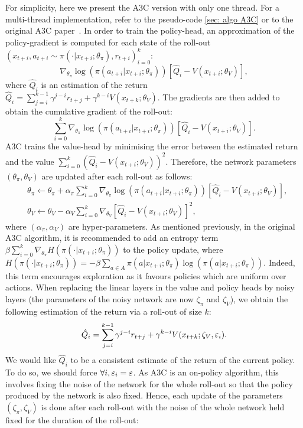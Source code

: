 \documentclass{article}
\begin{document}
For simplicity, here we present the A3C version with only one thread. For a  multi-thread implementation, refer to the pseudo-code \ref{sec: algo A3C} or to the original A3C paper~\citep{mnih2016asynchronous}. In order to train the policy-head, an approximation of the policy-gradient is computed for each state of the roll-out $(x_{t+i},a_{t+i}\sim\pi(\cdot|x_{t+i};\theta_\pi),r_{t+i})_{i=0}^{k}$:
 \begin{equation}
 \nabla_{\theta_\pi}\log(\pi(a_{t+i}|x_{t+i};\theta_\pi))[\hat{Q}_i-V(x_{t+i};\theta_V)],  
 \end{equation}
 where $\hat{Q}_i$ is an estimation of the return $\hat{Q}_i=\sum_{j=i}^{k-1}\gamma^{j-i}r_{t+j}+\gamma^{k-i}V(x_{t+k};\theta_V).$ The gradients are then added to obtain the cumulative gradient of the roll-out:
 \begin{equation}
 \sum_{i=0}^k\nabla_{\theta_\pi}\log(\pi(a_{t+i}|x_{t+i};\theta_\pi))[\hat{Q}_i-V(x_{t+i};\theta_V)].
 \end{equation}
 A3C trains the value-head by minimising the error between the estimated return and the value $\sum_{i=0}^k(\hat{Q}_i-V(x_{t+i};\theta_V))^2$. Therefore, the network parameters $(\theta_\pi,\theta_V)$ are updated after each roll-out as follows:
 \begin{align}
 &\theta_\pi \leftarrow \theta_\pi + \alpha_\pi\sum_{i=0}^k\nabla_{\theta_\pi}\log(\pi(a_{t+i}|x_{t+i};\theta_\pi))[\hat{Q}_i-V(x_{t+i};\theta_V)],
 \\
 &\theta_V \leftarrow \theta_V -\alpha_V\sum_{i=0}^k\nabla_{\theta_V}[\hat{Q}_i-V(x_{t+i};\theta_V)]^2,
 \end{align}
 where $(\alpha_\pi,\alpha_V)$ are hyper-parameters. As mentioned previously, in the original A3C algorithm, it is recommended to add an entropy term $\beta\sum_{i=0}^k\nabla_{\theta_\pi} H(\pi(\cdot|x_{t+i};\theta_\pi))$ to the policy update, where $H(\pi(\cdot|x_{t+i};\theta_\pi))=-\beta\sum_{a\in A}\pi(a|x_{t+i};\theta_\pi)\log(\pi(a|x_{t+i};\theta_\pi))$. Indeed, this term encourages exploration as it favours policies which are uniform over actions. 
 When replacing the linear layers in the value and policy heads by noisy layers (the parameters of the noisy network are now $\zeta_\pi$ and $\zeta_V$), we obtain the following estimation of the return via a roll-out of size $k$:
 \begin{equation}
 \hat{Q}_i=\sum_{j=i}^{k-1}\gamma^{j-i}r_{t+j}+\gamma^{k-i}V(x_{t+k};\zeta_V,\varepsilon_i).
 \end{equation}
 We would like $\hat{Q}_i$ to be a consistent estimate of the return of the current policy. To do so, we should force $\forall i, \varepsilon_i=\varepsilon$. As A3C is an on-policy algorithm, this involves fixing the noise of the network for the whole roll-out so that the policy produced by the network is also fixed. Hence, each update of the parameters $(\zeta_\pi,\zeta_V)$ is done after each roll-out with the noise of the whole network held fixed for the duration of the roll-out:
\end{document}
